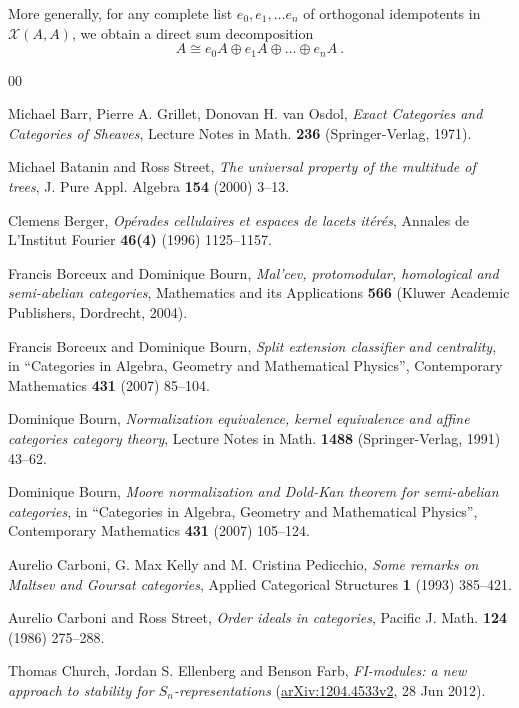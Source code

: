 \documentclass[a4paper,12pt,reqno]{amsart}
\theoremstyle{definition}
\theoremstyle{fact}
\theoremstyle{genquest}
\theoremstyle{step}
\def\CX{{\mathscr X}}
\begin{document}
More generally, for any complete list $e_0, e_1, \dots e_n$ of orthogonal idempotents
in $\CX (A,A)$, we obtain a direct sum decomposition
$$A\cong e_0A \oplus e_1A \oplus \dots \oplus e_nA \ .$$

\begin{thebibliography}{00}

 Michael Barr, Pierre A. Grillet, Donovan H. van Osdol, \textit{Exact Categories and Categories of Sheaves}, Lecture Notes in Math. \textbf{236} 
(Springer-Verlag, 1971).

 Michael Batanin and Ross Street, \textit{The universal property of the multitude of trees}, J. Pure Appl. Algebra \textbf{154} (2000) 3--13.\label{UPMT}

 Clemens Berger, \textit{Op\'erades cellulaires et espaces de lacets it\'er\'es}, Annales de L'Institut Fourier \textbf{46(4)} (1996) 1125--1157.\label{Berger1996} 

 Francis Borceux and Dominique Bourn, \textit{Mal'cev, protomodular, homological and semi-abelian categories}, Mathematics and its Applications \textbf{566} (Kluwer Academic Publishers, Dordrecht, 2004).

 Francis Borceux and Dominique Bourn, \textit{Split extension classifier and centrality}, in ``Categories in Algebra, Geometry and Mathematical Physics'', 
Contemporary Mathematics \textbf{431} (2007) 85--104.\label{BorBou07}

 Dominique Bourn, \textit{Normalization equivalence, kernel equivalence and affine categories category theory}, Lecture Notes in Math. \textbf{1488} (Springer-Verlag, 1991) 43--62.\label{Bourn91}

 Dominique Bourn, \textit{Moore normalization and Dold-Kan theorem for semi-abelian categories}, 
in ``Categories in Algebra, Geometry and Mathematical Physics'', 
Contemporary Mathematics \textbf{431} (2007) 105--124.\label{Bourn07}

 Aurelio Carboni, G. Max Kelly and M. Cristina Pedicchio, \textit{Some remarks on Maltsev and Goursat categories}, Applied Categorical Structures \textbf{1} (1993) 385--421.\label{CKP93}

 Aurelio Carboni and Ross Street, \textit{Order ideals in categories}, 
Pacific J. Math. \textbf{124} (1986) 275--288.\label{CarSt86}

 Thomas Church, Jordan S. Ellenberg and Benson Farb, \textit{FI-modules: a new approach to stability for $S_n$-representations} (\url{arXiv:1204.4533v2}, 28 Jun 2012).\label{CEF2012}


\end{thebibliography}
\end{document}
